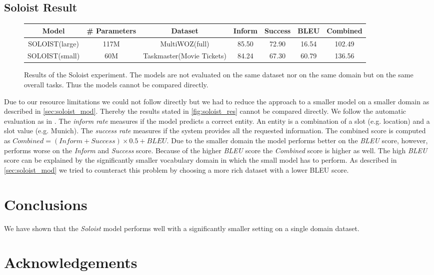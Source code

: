 \documentclass[twocolumn]{tum-article}
\begin{document}
\subsection{Soloist Result}
\begin{figure}[!h]
\centering
\begin{tabular}{c|c|c|c|c|c|c}
\hline
\textbf{Model} & \textbf{\# Parameters} & \textbf{Dataset} & \textbf{Inform} & \textbf{Success} & \textbf{BLEU} & \textbf{Combined}\\
\hline
SOLOIST(large) & 117M & MultiWOZ(full) & 85.50 & 72.90 & 16.54 & 102.49 \\
\hline
SOLOIST(small) & 60M & Taskmaster(Movie Tickets) & 84.24 & 67.30 & 60.79 & 136.56\\
\hline
\end{tabular}
\caption{Results of the Soloist experiment. The models are not evaluated on the same dataset nor on the same domain but on the same overall tasks. Thus the models cannot be compared directly. }
\label{fig:soloist_res}
\end{figure}
Due to our resource limitations we could not follow \cite{peng2020soloist} directly but we had to reduce the approach to a smaller model on a smaller domain as described in \autoref{sec:soloist_mod}. Thereby the results stated in \autoref{fig:soloist_res} cannot be compared directly. 
We follow the automatic evaluation as in \cite{peng2020soloist, budzianowski2020multiwoz}. The \textit{inform rate} measures if the model predicts a correct entity. An entity is a combination of a slot (e.g. location) and a slot value (e.g. Munich). The \textit{success rate} measures if the system provides all the requested information. The combined score is computed as $Combined = (Inform + Success) \times 0.5 + BLEU$.
Due to the smaller domain the model performs better on the \textit{BLEU} score, however, performs worse on the \textit{Inform} and \textit{Success} score. Because of the higher \textit{BLEU} score the \textit{Combined} score is higher as well. 
The high \textit{BLEU} score can be explained by the significantly smaller vocabulary domain in which the small model has to perform. As described in \autoref{sec:soloist_mod} we tried to counteract this problem by choosing a more rich dataset with a lower BLEU score.  
\section{Conclusions}
We have shown that the \textit{Soloist} model performs well with a significantly smaller setting on a single domain dataset.   
\section*{Acknowledgements}


\end{document}
